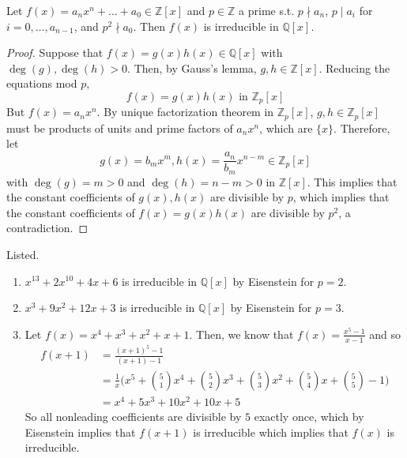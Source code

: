   \begin{theorem}
    Let $f(x) = a_n x^n + \ldots + a_0 \in \mathbb{Z}[x]$ and $p \in \mathbb{Z}$ a prime s.t. $p \nmid a_n$, $p \mid a_i$ for $i = 0, \ldots, a_{n-1}$, and $p^2 \nmid a_0$. Then $f(x)$ is irreducible in $\mathbb{Q}[x]$. 
  \end{theorem}
  \begin{proof}
    Suppose that $f(x) = g(x) h(x) \in \mathbb{Q}[x]$ with $\deg(g), \deg(h) > 0$. Then, by Gauss's lemma, $g, h \in \mathbb{Z}[x]$. Reducing the equations mod $p$, 
    \begin{equation}
      f(x) = g(x) h(x) \text{ in } \mathbb{Z}_p [x]
    \end{equation}
    But $f(x) = a_n x^n$. By unique factorization theorem in $\mathbb{Z}_p [x]$, $g, h \in \mathbb{Z}_p [x]$ must be products of units and prime factors of $a_n x^n$, which are $\{x\}$. Therefore, let 
    \begin{equation}
      g(x) = b_m x^m, h(x) = \frac{a_n}{b_m} x^{n-m} \in \mathbb{Z}_p [x]
    \end{equation}
    with $\deg(g) = m > 0$ and $\deg(h) = n - m > 0$ in $\mathbb{Z}[x]$. This implies that the constant coefficients of $g(x), h(x)$ are divisible by $p$, which implies that the constant coefficients of $f(x) = g(x) h(x)$ are divisible by $p^2$, a contradiction. 
  \end{proof}

  \begin{example}
    Listed. 
    \begin{enumerate}
      \item $x^{13} + 2x^{10} + 4x + 6$ is irreducible in $\mathbb{Q}[x]$ by Eisenstein for $p = 2$. 
      \item $x^3 + 9x^2 + 12x + 3$ is irreducible in $\mathbb{Q}[x]$ by Eisenstein for $p = 3$. 
      \item Let $f(x) = x^4 + x^3 + x^2 + x + 1$. Then, we know that $f(x) = \frac{x^5 - 1}{x-1}$ and so 
      \begin{align}
        f(x + 1) & = \frac{(x + 1)^5 - 1}{(x + 1) - 1} \\
                 & = \frac{1}{x} \bigg( x^5 + \binom{5}{1} x^4 + \binom{5}{2} x^3 + \binom{5}{3} x^2 + \binom{5}{4} x + \binom{5}{5} - 1 \bigg) \\
                 & = x^4 + 5x^3 + 10 x^2 + 10x + 5
      \end{align}
      So all nonleading coefficients are divisible by $5$ exactly once, which by Eisenstein implies that $f(x+1)$ is irreducible which implies that $f(x)$ is irreducible. 
    \end{enumerate}
  \end{example}

